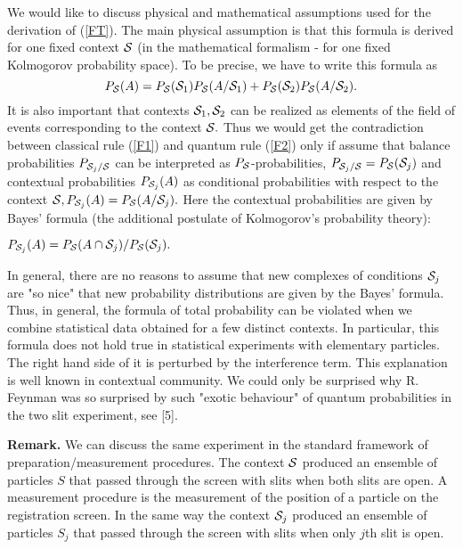 \documentclass[12pt,oneside,final,a4paper]{article}
\begin{document}
We would like to discuss physical and mathematical
assumptions used for the derivation of (\ref{FT}).
The main physical assumption is that this formula is  derived for one fixed context ${\cal S}$
(in the mathematical formalism - for one fixed Kolmogorov probability
space). To be precise, we have to write this formula as 
\begin{equation}
\label{FT1}
P_{{\cal S}}(A)= P_{{\cal S}}({\cal S}_1)  P_{{\cal S}}(A/{\cal S}_1)
+ P_{{\cal S}}({\cal S}_2)  P_{{\cal S}}(A/{\cal S}_2).
\end{equation}
It is also important that contexts ${\cal S}_1,  {\cal S}_2$ 
can be realized as elements of the field of events corresponding
to the context ${\cal S}.$
Thus we would get the contradiction between classical rule (\ref{F1}) and
quantum rule (\ref{F2}) only if assume that balance probabilities
$P_{{\cal S}_j/{\cal S}}$ can be interpreted as 
$P_{{\cal S}}$-probabilities, $P_{{\cal S}_j/{\cal S}}=P_{{\cal S}} ({\cal S}_j)$ 
and contextual probabilities $P_{{\cal S}_j}(A)$
as conditional probabilities with respect to the context ${\cal S}, P_{{\cal S}_j}(A)=
P_{{\cal S}}(A/{\cal S}_j).$  Here the contextual 
probabilities are given by Bayes' formula
(the additional postulate of Kolmogorov's probability theory):

$P_{{\cal S}_j}(A)= P_{{\cal S}}(A \cap {\cal S}_j)/ P_{{\cal S}}({\cal S}_j) .$

In general, there are no reasons to assume that new complexes of conditions ${\cal S}_j$
are "so nice" that new probability distributions are given by the Bayes' formula.
Thus, in general, the formula of total probability can be violated
when we combine statistical data obtained for a few distinct contexts.
In particular,
this formula does not hold true in statistical experiments with elementary particles.
The right hand side of it is perturbed by the interference term. This  explanation
is well known in contextual community.  We could only be surprised why R. Feynman 
was so surprised by such "exotic behaviour" of quantum probabilities in the two
slit experiment, see [5]. 

{\bf Remark.} {\small We can discuss the same experiment in the standard framework of 
preparation/measurement procedures. The context ${\cal S}$ produced an ensemble of 
particles $S$ that passed through the screen with slits  when both slits are open. A measurement 
procedure is the measurement of the position of a particle on the registration screen.
In the same way the context ${\cal S}_j$ produced an ensemble of 
particles $S_j$ that passed through the screen with slits when only $j$th slit is open.}
\end{document}
